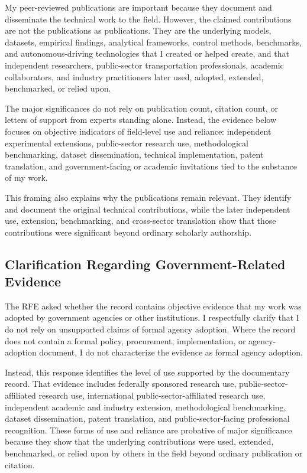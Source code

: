 \documentclass[11pt,letterpaper]{article}
\begin{document}
My peer-reviewed publications are important because they document and disseminate the technical work to the field. However, the claimed contributions are not the publications as publications. They are the underlying models, datasets, empirical findings, analytical frameworks, control methods, benchmarks, and autonomous-driving technologies that I created or helped create, and that independent researchers, public-sector transportation professionals, academic collaborators, and industry practitioners later used, adopted, extended, benchmarked, or relied upon.

The major significances do not rely on publication count, citation count, or letters of support from experts standing alone. Instead, the evidence below focuses on objective indicators of field-level use and reliance: independent experimental extensions, public-sector research use, methodological benchmarking, dataset dissemination, technical implementation, patent translation, and government-facing or academic invitations tied to the substance of my work.

This framing also explains why the publications remain relevant. They identify and document the original technical contributions, while the later independent use, extension, benchmarking, and cross-sector translation show that those contributions were significant beyond ordinary scholarly authorship.

\subsection*{Clarification Regarding Government-Related Evidence}

The RFE asked whether the record contains objective evidence that my work was adopted by government agencies or other institutions. I respectfully clarify that I do not rely on unsupported claims of formal agency adoption. Where the record does not contain a formal policy, procurement, implementation, or agency-adoption document, I do not characterize the evidence as formal agency adoption.

Instead, this response identifies the level of use supported by the documentary record. That evidence includes federally sponsored research use, public-sector-affiliated research use, international public-sector-affiliated research use, independent academic and industry extension, methodological benchmarking, dataset dissemination, patent translation, and public-sector-facing professional recognition. These forms of use and reliance are probative of major significance because they show that the underlying contributions were used, extended, benchmarked, or relied upon by others in the field beyond ordinary publication or citation.
\end{document}
